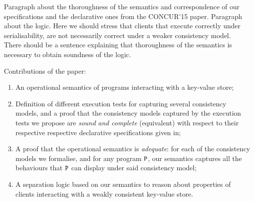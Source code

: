 
\ac{Paragraph about the thoroughness of the semantics and 
correspondence of our specifications and the declarative 
ones from the CONCUR'15 paper. Paragraph about the logic. 
Here we should stress that clients that execute correctly 
under serialisability, are not necessarily correct under a 
weaker consistency model. There should  be a sentence explaining 
that thoroughness of the semantics is necessary to obtain soundness 
of the logic.}

Contributions of the paper: 
\begin{enumerate}
\item An operational semantics of programs interacting with a key-value store; 
\item Definition of different execution tests for capturing several consistency models,
and a proof that the consistency models captured by the execution tests we propose 
are \emph{sound and complete} (equivalent) with respect to their respective  respective declarative specifications 
given in\cite{framework-concur};
\item A proof that the operational semantics is \emph{adequate}: for each of the 
consistency models we formalise, and for any program $\texttt{P}$, our semantics captures 
all the behaviours that $\texttt{P}$ can display under said consistency model;
\item A separation logic based on our semantics to reason about properties 
of clients interacting with a weakly consistent key-value store.
\end{enumerate}

